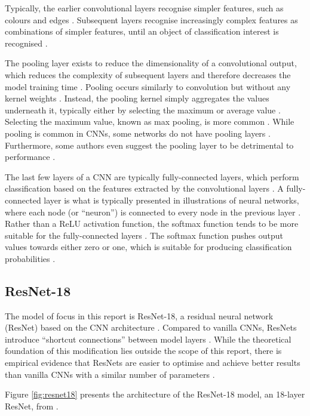 Typically, the earlier convolutional layers recognise simpler features, such as colours and edges \cite{ibm_2020}. Subsequent layers recognise increasingly complex features as combinations of simpler features, until an object of classification interest is recognised \cite{ibm_2020}.

The pooling layer exists to reduce the dimensionality of a convolutional output, which reduces the complexity of subsequent layers and therefore decreases the model training time \cite{ibm_2020}. Pooling occurs similarly to convolution but without any kernel weights \cite{ibm_2020}. Instead, the pooling kernel simply aggregates the values underneath it, typically either by selecting the maximum or average value \cite{ibm_2020}. Selecting the maximum value, known as max pooling, is more common \cite{ibm_2020}. While pooling is common in CNNs, some networks do not have pooling layers \cite{springenberg_2014}. Furthermore, some authors even suggest the pooling layer to be detrimental to performance \cite{sunkara_2023}.

The last few layers of a CNN are typically fully-connected layers, which perform classification based on the features extracted by the convolutional layers \cite{ibm_2020}. A fully-connected layer is what is typically presented in illustrations of neural networks, where each node (or ``neuron'') is connected to every node in the previous layer \cite{ibm_2020}. Rather than a ReLU activation function, the softmax function tends to be more suitable for the fully-connected layers \cite{ibm_2020}. The softmax function pushes output values towards either zero or one, which is suitable for producing classification probabilities \cite{ibm_2020}.

\subsection{ResNet-18}

The model of focus in this report is ResNet-18, a residual neural network (ResNet) based on the CNN architecture \cite{he_2016}. Compared to vanilla CNNs, ResNets introduce ``shortcut connections'' between model layers \cite{he_2016}. While the theoretical foundation of this modification lies outside the scope of this report, there is empirical evidence that ResNets are easier to optimise and achieve better results than vanilla CNNs with a similar number of parameters \cite{he_2016}.

Figure \ref{fig:resnet18} presents the architecture of the ResNet-18 model, an 18-layer ResNet, from \cite{ramzan_2019}.

